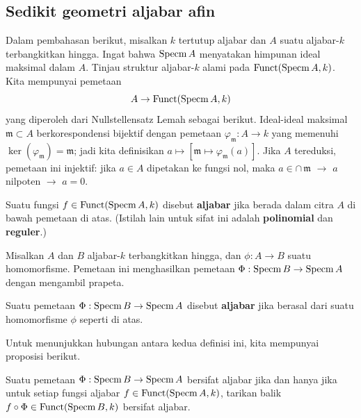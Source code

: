 \subsection{Sedikit geometri aljabar afin}

Dalam pembahasan berikut, misalkan $k$ tertutup aljabar dan $A$ suatu aljabar-$k$ terbangkitkan hingga. Ingat bahwa $\operatorname{Specm} A$ menyatakan himpunan ideal maksimal dalam $A$. Tinjau struktur aljabar-$k$ alami pada $\mathrm{Funct}(\operatorname{Specm} A, k)$. Kita mempunyai pemetaan
$$A \rightarrow \mathrm{Funct}(\operatorname{Specm} A, k)$$
yang diperoleh dari Nullstellensatz Lemah sebagai berikut. Ideal-ideal maksimal $\mathfrak{m}\subset A$ berkorespondensi bijektif dengan pemetaan $\varphi_\mathfrak{m}:A\rightarrow k$ yang memenuhi $\ker(\varphi_\mathfrak{m})=\mathfrak{m}$; jadi kita definisikan $a\longmapsto [\mathfrak{m}\longmapsto \varphi_\mathfrak{m}(a)]$. Jika $A$ tereduksi, pemetaan ini injektif: jika $a\in A$ dipetakan ke fungsi nol, maka $a\in \cap\, \mathfrak{m}$ $\rightarrow$ $a$ nilpoten $\rightarrow$ $a=0$.\\

\begin{definition} Suatu fungsi $f\in \mathrm{Funct}(\operatorname{Specm} A,k)$ disebut {\bf aljabar} jika berada dalam citra $A$ di bawah pemetaan di atas. (Istilah lain untuk sifat ini adalah {\bf polinomial} dan {\bf reguler}.) \end{definition}

Misalkan $A$ dan $B$ aljabar-$k$ terbangkitkan hingga, dan $\phi:A\rightarrow B$ suatu homomorfisme. Pemetaan ini menghasilkan pemetaan $\Phi:\operatorname{Specm} B\rightarrow \operatorname{Specm} A$ dengan mengambil prapeta.

\begin{definition} Suatu pemetaan $\Phi:\operatorname{Specm} B\rightarrow \operatorname{Specm} A$ disebut {\bf aljabar} jika berasal dari suatu homomorfisme $\phi$ seperti di atas.\end{definition}

Untuk menunjukkan hubungan antara kedua definisi ini, kita mempunyai proposisi berikut.

\begin{proposition} Suatu pemetaan $\Phi:\operatorname{Specm} B\rightarrow \operatorname{Specm} A$ bersifat aljabar jika dan hanya jika untuk setiap fungsi aljabar $f\in \mathrm{Funct}(\operatorname{Specm} A,k)$, tarikan balik $f\circ \Phi\in \mathrm{Funct}(\operatorname{Specm} B,k)$ bersifat aljabar.\end{proposition}

